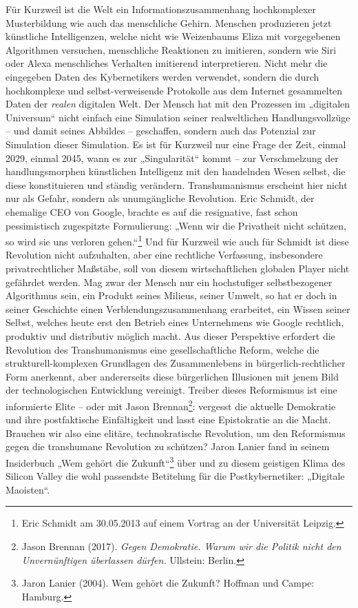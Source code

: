 \documentclass[a4paper,11pt]{article}
\begin{document}
Für Kurzweil ist die Welt ein Informationszusammenhang hochkomplexer
Musterbildung wie auch das menschliche Gehirn. Menschen produzieren jetzt
künstliche Intelligenzen, welche nicht wie Weizenbaums Eliza mit vorgegebenen
Algorithmen versuchen, menschliche Reaktionen zu imitieren, sondern wie Siri
oder Alexa menschliches Verhalten imitierend interpretieren. Nicht mehr die
eingegeben Daten des Kybernetikers werden verwendet, sondern die durch
hochkomplexe und selbst-verweisende Protokolle aus dem Internet gesammelten
Daten der \emph{realen} digitalen Welt. Der Mensch hat mit den Prozessen im
„digitalen Universum“ nicht einfach eine Simulation seiner realweltlichen
Handlungsvollzüge -- und damit seines Abbildes -- geschaffen, sondern auch das
Potenzial zur Simulation dieser Simulation. Es ist für Kurzweil nur eine Frage
der Zeit, einmal 2029, einmal 2045, wann es zur „Singularität“ kommt -- zur
Verschmelzung der handlungsmorphen künstlichen Intelligenz mit den handelnden
Wesen selbst, die diese konstituieren und ständig verändern.  Transhumanismus
erscheint hier nicht nur als Gefahr, sondern als unumgängliche
Revolution. Eric Schmidt, der ehemalige CEO von Google, brachte es auf die
resignative, fast schon pessimistisch zugespitzte Formulierung: „Wenn wir die
Privatheit nicht schützen, so wird sie uns verloren gehen.“\footnote{Eric
  Schmidt am 30.05.2013 auf einem Vortrag an der Universität Leipzig.} Und für
Kurzweil wie auch für Schmidt ist diese Revolution nicht aufzuhalten, aber
eine rechtliche Verfassung, insbesondere privatrechtlicher Maßstäbe, soll von
diesem wirtschaftlichen globalen Player nicht gefährdet werden. Mag zwar der
Mensch nur ein hochstufiger selbstbezogener Algorithmus sein, ein Produkt
seines Milieus, seiner Umwelt, so hat er doch in seiner Geschichte einen
Verblendungszusammenhang erarbeitet, ein Wissen seiner Selbst, welches heute
erst den Betrieb eines Unternehmens wie Google rechtlich, produktiv und
distributiv möglich macht. Aus dieser Perspektive erfordert die Revolution des
Transhumanismus eine gesellschaftliche Reform, welche die
strukturell-komplexen Grundlagen des Zusammenlebens in bürgerlich-rechtlicher
Form anerkennt, aber andererseits diese bürgerlichen Illusionen mit jenem Bild
der technologischen Entwicklung vereinigt. Treiber dieses Reformismus ist eine
informierte Elite -- oder mit Jason Brennan\footnote{Jason Brennan (2017).
  \emph{Gegen Demokratie. Warum wir die Politik nicht den Unvernünftigen
    überlassen dürfen.} Ullstein: Berlin.}: vergesst die aktuelle Demokratie
und ihre postfaktische Einfältigkeit und lasst eine Epistokratie an die Macht.
Brauchen wir also eine elitäre, technokratische Revolution, um den Reformismus
gegen die transhumane Revolution zu schützen?  Jaron Lanier fand in seinem
Insiderbuch „Wem gehört die Zukunft“\footnote{Jaron Lanier (2004). Wem gehört
  die Zukunft? Hoffman und Campe: Hamburg.} über und zu diesem geistigen Klima
des Silicon Valley die wohl passendste Betitelung für die Postkybernetiker:
„Digitale Maoisten“.
\end{document}
